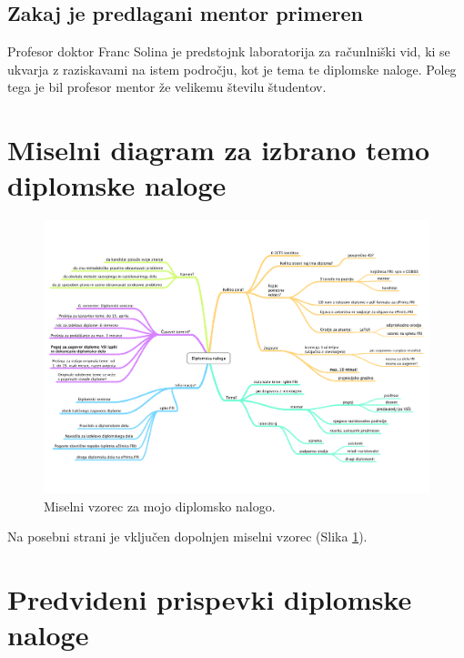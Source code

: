 \documentclass[11pt,a4paper]{article}
\begin{document}
\subsection{Zakaj je predlagani mentor primeren}

Profesor doktor Franc Solina je predstojnk laboratorija za računlniški vid,
ki se ukvarja z raziskavami na istem področju, kot je tema te diplomske
naloge. Poleg tega je bil profesor mentor že velikemu številu študentov.



\section{Miselni diagram za izbrano temo diplomske naloge}

\begin{figure}[p]
\centerline{\includegraphics[height=1.0\textwidth, angle=90]{mindmap.pdf}}
\caption{Miselni vzorec za mojo diplomsko nalogo.}
\label{sl:mindmap}
\end{figure}

Na posebni strani je vključen dopolnjen miselni vzorec (Slika \ref{sl:mindmap}).



\section{Predvideni prispevki diplomske naloge}
\end{document}
